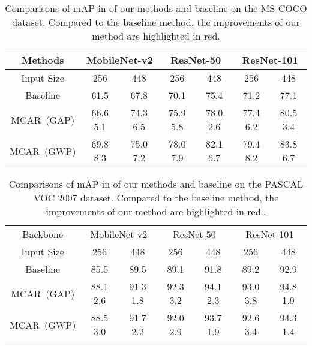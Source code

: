 \documentclass[journal]{IEEEtran}
\begin{document}
\begin{table*}[t]
	\centering
	\caption{Comparisons of mAP in  of our methods and baseline on the MS-COCO dataset. Compared to the baseline method, the improvements of our method are highlighted in red.}\label{table:coco-as}
	\footnotesize{
	\begin{tabular}{|c||c|c||c|c||c|c|}
	\hline
	Methods  &\multicolumn{2}{c||}{MobileNet-v2} &\multicolumn{2}{c||}{ResNet-50} &\multicolumn{2}{c|}{ResNet-101}\\  
	\hline
         Input Size                &256  &448   &256  &448   &256  &448 \\     
	\hline\hline
	Baseline                  &61.5 &67.8  &70.1 &75.4  &71.2 &77.1  \\
	\hline
	MCAR~(GAP)        &66.6  {\color{red} 5.1} &74.3  {\color{red} 6.5}  &75.9  {\color{red} 5.8} &78.0 {\color{red} 2.6}  &77.4  {\color{red} 6.2}  &80.5  {\color{red} 3.4}  \\
	MCAR~(GWP)       &69.8  {\color{red} 8.3} &75.0 {\color{red} 7.2}   &78.0  {\color{red} 7.9} &82.1 {\color{red} 6.7}  &79.4  {\color{red} 8.2} &83.8   {\color{red} 6.7} \\
        \hline
       \end{tabular}}
       \end{table*}
\begin{table*}[t]
	\centering
	\caption{Comparisons of mAP in  of our methods and baseline on the PASCAL VOC 2007 dataset. Compared to the baseline method, the improvements of our method are highlighted in red..}\label{table:voc07-as}
	\footnotesize{
	\begin{tabular}{|c||c|c||c|c||c|c|}
	\hline
	Backbone  &\multicolumn{2}{c||}{MobileNet-v2} &\multicolumn{2}{c||}{ResNet-50} &\multicolumn{2}{c|}{ResNet-101}\\   
	\cline{1-7} 
	Input Size                &256 &448  &256 &448 &256 &448 \\              
	\hline\hline
	Baseline             &85.5           &89.5           &89.1          &91.8  &89.2 &92.9 \\
	\hline
	MCAR~(GAP)    &88.1 {\color{red} 2.6}   &91.3 {\color{red} 1.8} &92.3 {\color{red} 3.2}&94.1 {\color{red} 2.3} &93.0 {\color{red} 3.8} &94.8 {\color{red} 1.9}\\
	MCAR~(GWP)   &88.5 {\color{red} 3.0}   &91.7 {\color{red} 2.2} &92.0 {\color{red} 2.9}&93.7 {\color{red} 1.9} &92.6 {\color{red} 3.4} &94.3 {\color{red} 1.4}\\
        \hline
       \end{tabular}}
\end{table*}
\end{document}
